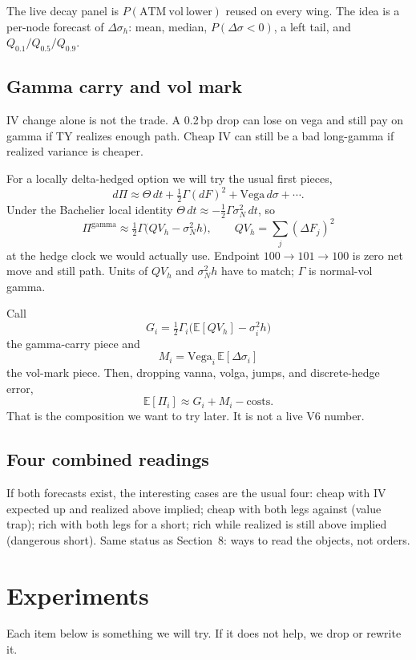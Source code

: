 \documentclass[11pt]{article}
\begin{document}
The live decay panel is \(P(\mathrm{ATM\ vol\ lower})\) reused on
every wing.  The idea is a per-node forecast of \(\Delta\sigma_h\):
mean, median, \(P(\Delta\sigma<0)\), a left tail, and
\(Q_{0.1}/Q_{0.5}/Q_{0.9}\).

\subsection{Gamma carry and vol mark}

IV change alone is not the trade.  A 0.2\,bp drop can lose on vega
and still pay on gamma if TY realizes enough path.  Cheap IV can
still be a bad long-gamma if realized variance is cheaper.

For a locally delta-hedged option we will try the usual first
pieces,
\[
d\Pi
\approx
\Theta\,dt
+\tfrac12\Gamma(dF)^2
+\mathrm{Vega}\,d\sigma
+\cdots.
\]
Under the Bachelier local identity
\(\Theta\,dt\approx-\tfrac12\Gamma\sigma_N^2\,dt\), so
\[
\Pi^{\mathrm{gamma}}
\approx
\tfrac12\Gamma\bigl(QV_h-\sigma_N^2 h\bigr),
\qquad
QV_h=\sum_j(\Delta F_j)^2
\]
at the hedge clock we would actually use.  Endpoint
\(100\to 101\to 100\) is zero net move and still path.  Units of
\(QV_h\) and \(\sigma_N^2 h\) have to match; \(\Gamma\) is
normal-vol gamma.

Call
\[
G_i=\tfrac12\Gamma_i\bigl(\mathbb{E}[QV_h]-\sigma_i^2 h\bigr)
\]
the gamma-carry piece and
\[
M_i=\mathrm{Vega}_i\,\mathbb{E}[\Delta\sigma_i]
\]
the vol-mark piece.  Then, dropping vanna, volga, jumps, and
discrete-hedge error,
\[
\mathbb{E}[\Pi_i]\approx G_i+M_i-\mathrm{costs}.
\]
That is the composition we want to try later.  It is not a live V6
number.

\subsection{Four combined readings}

If both forecasts exist, the interesting cases are the usual four:
cheap with IV expected up and realized above implied; cheap with
both legs against (value trap); rich with both legs for a short;
rich while realized is still above implied (dangerous short).  Same
status as Section~8: ways to read the objects, not orders.


\section{Experiments}

Each item below is something we will try.  If it does not help, we
drop or rewrite it.
\end{document}
